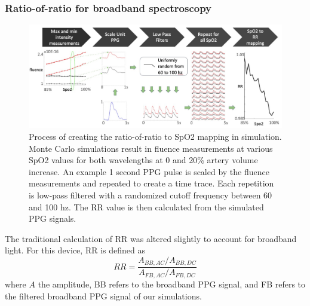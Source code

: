         \subsubsection{Ratio-of-ratio for broadband spectroscopy}
        \begin{figure}
            \begin{center}
            \includegraphics[width=\textwidth]{fig/moxi/D3process.pdf}
            \end{center}
            \caption{Process of creating the ratio-of-ratio to SpO2 mapping in simulation. Monte Carlo simulations result in fluence measurements at various SpO2 values for both wavelengths at 0 and 20\% artery volume increase. An example 1 second PPG pulse is scaled by the fluence measurements and repeated to create a time trace. Each repetition is low-pass filtered with a randomized cutoff frequency between 60 and 100 hz. The RR value is then calculated from the simulated PPG signals.} 
            \label{fig:D3process}
        \end{figure} 
        The traditional calculation of RR was altered slightly to account for broadband light. For this device, RR is defined as 
        \begin{equation} \label{eq:RRbroadband}
            RR = \frac{ A_{BB,AC}/A_{BB,DC} }{ A_{FB,AC}/A_{FB,DC} }
        \end{equation}
        where $A$ the amplitude, BB refers to the broadband PPG signal, and FB refers to the filtered broadband PPG signal of our simulations. 
        
